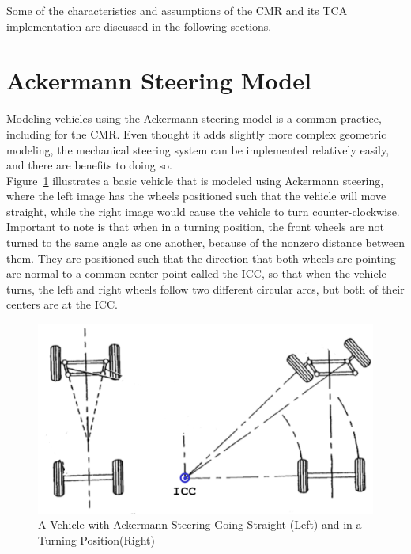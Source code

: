 Some of the characteristics and assumptions of the \ac{CMR} and its \ac{TCA} implementation are discussed in the following sections.

\section{Ackermann Steering Model}\label{traction_control:algorithms:ackermann-steering-section}
Modeling vehicles using the Ackermann steering model is a common practice, including for the \ac{CMR}. Even thought it adds slightly more complex geometric modeling, the mechanical steering system can be implemented relatively easily, and there are benefits to doing so. \\

Figure~\ref{traction_control:algorithms:ackermann-steering} illustrates a basic vehicle that is modeled using Ackermann steering, where the left image has the wheels positioned such that the vehicle will move straight, while the right image would cause the vehicle to turn counter-clockwise. Important to note is that when in a turning position, the front wheels are not turned to the same angle as one another, because of the nonzero distance between them. They are positioned such that the direction that both wheels are pointing are normal to a common center point called the \ac{ICC}, so that when the vehicle turns, the left and right wheels follow two different circular arcs, but both of their centers are at the \ac{ICC}.

\begin{figure}[H]
	\centering
	\includegraphics[width=.9\textwidth]{sections/algorithms/images/ackermann_steering.png}
	\caption{A Vehicle with Ackermann Steering Going Straight (Left) and in a Turning Position(Right)}
	\label{traction_control:algorithms:ackermann-steering}
\end{figure}

